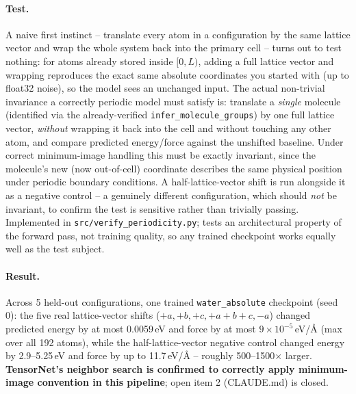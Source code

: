 \documentclass[11pt]{article}
\begin{document}
\paragraph{Test.} A naive first instinct -- translate every atom in a
configuration by the same lattice vector and wrap the whole system back into
the primary cell -- turns out to test nothing: for atoms already stored
inside $[0, L)$, adding a full lattice vector and wrapping reproduces the
exact same absolute coordinates you started with (up to float32 noise), so
the model sees an unchanged input. The actual non-trivial invariance a
correctly periodic model must satisfy is: translate a \emph{single} molecule
(identified via the already-verified \texttt{infer\_molecule\_groups}) by one
full lattice vector, \emph{without} wrapping it back into the cell and
without touching any other atom, and compare predicted energy/force against
the unshifted baseline. Under correct minimum-image handling this must be
exactly invariant, since the molecule's new (now out-of-cell) coordinate
describes the same physical position under periodic boundary conditions. A
half-lattice-vector shift is run alongside it as a negative control -- a
genuinely different configuration, which should \emph{not} be invariant, to
confirm the test is sensitive rather than trivially passing. Implemented in
\texttt{src/verify\_periodicity.py}; tests an architectural property of the
forward pass, not training quality, so any trained checkpoint works equally
well as the test subject.

\paragraph{Result.} Across 5 held-out configurations, one trained
\texttt{water\_absolute} checkpoint (seed 0): the five real lattice-vector
shifts ($+a, +b, +c, +a{+}b{+}c, -a$) changed predicted energy by at most
0.0059\,eV and force by at most $9{\times}10^{-5}$\,eV/\AA{} (max over all
192 atoms), while the half-lattice-vector negative control changed energy by
2.9--5.25\,eV and force by up to 11.7\,eV/\AA{} -- roughly 500--1500$\times$
larger. \textbf{TensorNet's neighbor search is confirmed to correctly apply
minimum-image convention in this pipeline}; open item 2 (CLAUDE.md) is
closed.
\end{document}
